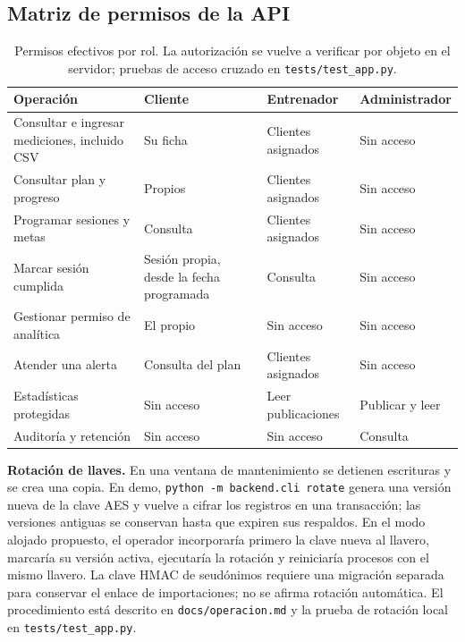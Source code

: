 \documentclass[11pt]{article}
\begin{document}
\subsection*{Matriz de permisos de la API}
\begin{table}[H]
\centering\small
\begin{tabularx}{\textwidth}{@{}Yp{2.9cm}p{3.2cm}p{2.7cm}@{}}
\toprule
Operación & Cliente & Entrenador & Administrador \\
\midrule
Consultar e ingresar mediciones, incluido CSV & Su ficha & Clientes asignados & Sin acceso \\
Consultar plan y progreso & Propios & Clientes asignados & Sin acceso \\
Programar sesiones y metas & Consulta & Clientes asignados & Sin acceso \\
Marcar sesión cumplida & Sesión propia, desde la fecha programada & Consulta & Sin acceso \\
Gestionar permiso de analítica & El propio & Sin acceso & Sin acceso \\
Atender una alerta & Consulta del plan & Clientes asignados & Sin acceso \\
Estadísticas protegidas & Sin acceso & Leer publicaciones & Publicar y leer \\
Auditoría y retención & Sin acceso & Sin acceso & Consulta \\
\bottomrule
\end{tabularx}
\caption{Permisos efectivos por rol. La autorización se vuelve a verificar por objeto en el servidor; pruebas de acceso cruzado en \texttt{tests/test\_app.py}.}
\label{tab:permisos}
\end{table}

\textbf{Rotación de llaves.} En una ventana de mantenimiento se detienen escrituras y se crea una copia. En demo, \texttt{python -m backend.cli rotate} genera una versión nueva de la clave AES y vuelve a cifrar los registros en una transacción; las versiones antiguas se conservan hasta que expiren sus respaldos. En el modo alojado propuesto, el operador incorporaría primero la clave nueva al llavero, marcaría su versión activa, ejecutaría la rotación y reiniciaría procesos con el mismo llavero. La clave HMAC de seudónimos requiere una migración separada para conservar el enlace de importaciones; no se afirma rotación automática. El procedimiento está descrito en \texttt{docs/operacion.md} y la prueba de rotación local en \texttt{tests/test\_app.py}.
\end{document}
